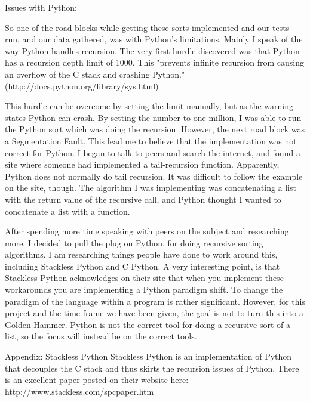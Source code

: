 

Issues with Python:

So one of the road blocks while getting these sorts implemented and our tests run, and our
data gathered, was with Python's limitations. Mainly I speak of the way Python handles
recursion. The very first hurdle discovered was that Python has a recursion depth limit
of 1000. This "prevents infinite recursion from causing an overflow of the C stack and 
crashing Python." (http://docs.python.org/library/sys.html)

This hurdle can be overcome by setting the limit manually, but as the warning states
Python can crash. By setting the number to one million, I was able to run the Python sort
which was doing the recursion. However, the next road block was a Segmentation Fault.
This lead me to believe that the implementation was not correct for Python. I began to
talk to peers and search the internet, and found a site where someone had implemented
a tail-recursion function. Apparently, Python does not normally do tail recursion.
It was difficult to follow the example on the site, though. The algorithm I was
implementing was concatenating a list with the return value of the recursive call,
and Python thought I wanted to concatenate a list with a function.

After spending more time speaking with peers on the subject and researching more,
I decided to pull the plug on Python, for doing recursive sorting algorithms. I am
researching things people have done to work around this, including Stackless Python
and C Python. A very interesting point, is that Stackless Python acknowledges on
their site that when you implement these workarounds you are implementing a Python
paradigm shift. To change the paradigm of the language within a program is rather
significant. However, for this project and the time frame we have been given, the
goal is not to turn this into a Golden Hammer. Python is not the correct tool for
doing a recursive sort of a list, so the focus will instead be on the correct tools.

Appendix: Stackless Python
Stackless Python is an implementation of Python that decouples the C stack and thus
skirts the recursion issues of Python. There is an excellent paper posted on their
website here: http://www.stackless.com/spcpaper.htm
